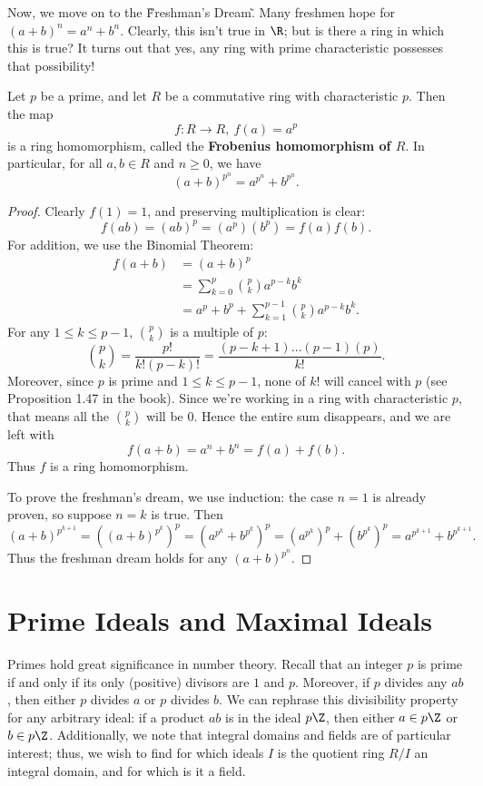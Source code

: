 \documentclass[math1530-lecture-notes]{subfiles}
\begin{document}
Now, we move on to the \~Freshman's Dream\~. Many freshmen hope for $(a+b)^n=a^n+b^n$. Clearly, this
isn't true in $\R$; but is there a ring in which this is true? It turns out that yes, any ring with
prime characteristic possesses that possibility!

\begin{theorem}{}
  Let $p$ be a prime, and let $R$ be a commutative ring with characteristic $p$. Then the map \[
    f: R\longrightarrow R,\ f(a)=a^p
  \] is a ring homomorphism, called the \textbf{Frobenius homomorphism of $R$}. In particular, for
  all $a,b\in R$ and $n\ge 0$, we have \[
    (a+b)^{p^n}=a^{p^n}+b^{p^n}
  .\] 
\end{theorem}
\begin{proof}[Proof]
  Clearly $f(1)=1$, and preserving multiplication is clear: \[
    f(ab)=(ab)^p=(a^p)(b^p)=f(a)f(b)
  .\] For addition, we use the Binomial Theorem:
  \begin{align*}
    f(a+b)&= (a+b)^p \\
          &= \sum_{k=0}^{p} \binom{p}{k} a^{p-k}b^k \\
          &= a^p + b^p + \sum_{k=1}^{p-1} \binom{p}{k}a^{p-k}b^{k}
        .\end{align*}
  For any $1\le k\le p-1$, $\binom{p}{k}$ is a multiple of $p$: \[
    \binom{p}{k}= \frac{p!}{k!(p-k)!}=\frac{(p-k+1)\ldots(p-1)(p)}{k!}
  .\] Moreover, since $p$ is prime and $1\le k\le p-1$, none of $k!$ will cancel with $p$ (see
  Proposition 1.47 in the book). Since we're working in a ring with characteristic $p$, that means
  all the $\binom{p}{k}$ will be $0$. Hence the entire sum disappears, and we are left with \[
    f(a+b)=a^n+b^n=f(a)+f(b)
  .\] Thus $f$ is a ring homomorphism.

  To prove the freshman's dream, we use induction: the case $n=1$ is already proven, so suppose
  $n=k$ is true. Then \[
    (a+b)^{p^{k+1}}=((a+b)^{p^k})^p=(a^{p^k}+b^{p^k})^p = (a^{p^k})^p +
    (b^{p^k})^p=a^{p^{k+1}}+b^{p^{k+1}}
  .\] Thus the freshman dream holds for any $(a+b)^{p^n}$.
\end{proof}


\section{Prime Ideals and Maximal Ideals}

Primes hold great significance in number theory. Recall that an integer $p$ is prime if and only if
its only (positive) divisors are $1$ and $p$. Moreover, if $p$ divides any $ab$, then either
$p$ divides $a$ or $p$ divides $b$. We can rephrase this divisibility property for any arbitrary
ideal: if a product $ab$ is in the ideal $p\Z$, then either $a\in p\Z$ or $b\in p\Z$. Additionally,
we note that integral domains and fields are of particular interest; thus, we wish to find for which
ideals $I$ is the quotient ring $R / I$ an integral domain, and for which is it a field.
\end{document}
